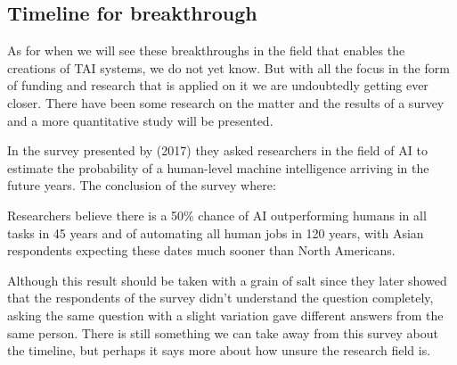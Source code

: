 \documentclass[12pt,A4]{report}
\theoremstyle{definition}
\begin{document}
\subsection{Timeline for breakthrough}
As for when we will see these breakthroughs in the field that enables the creations of TAI systems, we do not yet know. But with all the focus in the form of funding and research that is applied on it we are undoubtedly getting ever closer. There have been some research on the matter and the results of a survey and a more quantitative study will be presented. %

In the survey presented by \autocite{Grace et al} (2017) they asked researchers in the field of AI to estimate the probability of a human-level machine intelligence arriving in the future years. The conclusion of the survey where:
\begin{displayquote}
Researchers believe there is a 50\% chance of AI outperforming humans in all tasks in 45 years and of automating all human jobs in 120 years, with Asian respondents expecting these dates much sooner than North Americans.
\end{displayquote}
Although this result should be taken with a grain of salt since they later showed that the respondents of the survey didn't understand the question completely, asking the same question with a slight variation gave different answers from the same person. There is still something we can take away from this survey about the timeline, but perhaps it says more about how unsure the research field is. 



\end{document}
